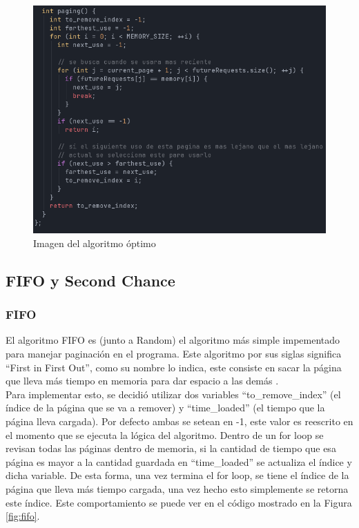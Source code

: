 \documentclass{report}
\begin{document}
\begin{figure}[h]
	\centering
	\includegraphics[width=0.8\linewidth]{figuras/optimal.png}
	\caption{Imagen del algoritmo óptimo}
	\label{fig:optimal}
\end{figure}


\subsection{FIFO y Second Chance}
\subsubsection{FIFO}
El algoritmo FIFO es (junto a Random) el algoritmo más simple impementado para manejar paginación en el programa.
Este algoritmo por sus siglas significa ``First in First Out'', como su nombre lo indica, este consiste en sacar la página que lleva más tiempo en memoria para dar espacio a las demás \cite{ref0}. \\

Para implementar esto, se decidió utilizar dos variables ``to\_remove\_index'' (el índice de la página que se va a remover) y ``time\_loaded'' (el tiempo que la página lleva cargada). 
Por defecto ambas se setean en -1, este valor es reescrito en el momento que se ejecuta la lógica del algoritmo.
Dentro de un for loop se revisan todas las páginas dentro de memoria, si la cantidad de tiempo que esa página es mayor a la cantidad guardada en ``time\_loaded'' se actualiza el índice y dicha variable.
De esta forma, una vez termina el for loop, se tiene el índice de la página que lleva más tiempo cargada, una vez hecho esto simplemente se retorna este índice.
Este comportamiento se puede ver en el código mostrado en la Figura \ref{fig:fifo}.
\end{document}

